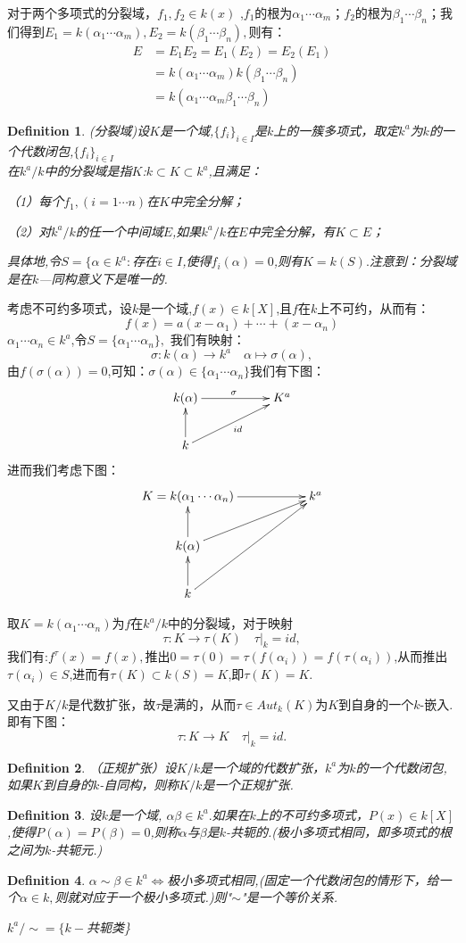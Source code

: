 \documentclass[UTF8]{article}
\newtheorem{defn}{Definition}[section]
\begin{document}
对于两个多项式的分裂域，$f_1,f_2\in k(x)$ ,$f_1$的根为$\alpha_1 \cdots \alpha_m$；$f_2$的根为$\beta_1 \cdots \beta_n$；我们得到$E_1=k(\alpha_1 \cdots \alpha_m),E_2=k(\beta_1 \cdots \beta_n),$则有：
\[
\begin{split}
E&=E_1E_2=E_1(E_2)=E_2(E_1)\\
&=k(\alpha_1 \cdots \alpha_m)k(\beta_1 \cdots \beta_n)\\
&=k(\alpha_1 \cdots \alpha_m \beta_1 \cdots \beta_n)
\end{split}
\]

\begin{defn}
(分裂域)\quad 设$K$是一个域,$\{f_i\}_{i\in I}$是$k$上的一簇多项式，取定$k^a$为$k$的一个代数闭包,$\{f_i\}_{i\in I}$\\在$k^a/k$中的分裂域是指$K$:$k\subset K\subset k^a$,且满足：

（1）每个$f_1,(i=1\cdots n)$在$K$中完全分解；

（2）对$k^a/k$的任一个中间域$E$,如果$k^a/k$在$E$中完全分解，有$K\subset E$；

具体地,令$S=\{\alpha\in k^a:$存在$i\in I$,使得$f_i(\alpha)=0$,则有$K=k(S).$注意到：分裂域是在$k$—同构意义下是唯一的.
\end{defn}
考虑不可约多项式，设$k$是一个域,$f(x)\in k[X]$,且$f$在$k$上不可约，从而有：
$$f(x)=a(x-\alpha_1)+\cdots+(x-\alpha_n)$$
$\alpha_1 \cdots \alpha_n\in k^a$,令$S=\{\alpha_1 \cdots \alpha_n\},$
我们有映射：$$\sigma:k(\alpha)\rightarrow k^a \quad \alpha\longmapsto\sigma(\alpha), $$
由$f(\sigma(\alpha))=0 $,可知：$\sigma(\alpha)\in \{\alpha_1 \cdots \alpha_n\}$我们有下图：$$\xymatrix{k(\alpha)\ar[rr]^{\sigma}&&K^{a}\\k\ar[u] \ar[rru]_{id}&}$$进而我们考虑下图：$$\xymatrix{K=k(\alpha_1 \cdots \alpha_n)\ar[rr]&&{k^a}\\k(\alpha) \ar[u] \ar[rru] && \\k \ar[u] \ar[rruu] &&}$$

取$K=k(\alpha_1 \cdots \alpha_n)$为$f$在$k^a/k$中的分裂域，对于映射$$\tau:K\rightarrow \tau(K) \quad \tau|_k=id,$$我们有:$f^{\tau}(x)=f(x),$推出$0=\tau(0)=\tau(f(\alpha_i))=f(\tau(\alpha_i))$,从而推出$\tau(\alpha_i)\in S$,进而有$\tau (K)\subset k(S)=K$,即$\tau (K)=K.$

又由于$K/k$是代数扩张，故$\tau$是满的，从而$\tau\in Aut_k(K)$为$K$到自身的一个$k$-嵌入.
即有下图：$$\tau:K\rightarrow K \quad\tau|_k=id.$$ 
\begin{defn}
（正规扩张）设$K/k$是一个域的代数扩张，$k^a$为$k$的一个代数闭包,如果$K$到自身的$k$-自同构，则称$K/k$是一个正规扩张.
\end{defn}
\begin{defn}
设$k$是一个域, $\alpha \beta \in k^a.$如果在$k$上的不可约多项式，$P(x)\in k[X]$,使得$P(\alpha)=P(\beta)=0$,则称$\alpha$与$\beta$是$k$-共轭的.(极小多项式相同，即多项式的根之间为$k$-共轭元.)
\end{defn}
\begin{defn}

$\alpha\sim \beta\in k^a\iff $极小多项式相同,(固定一个代数闭包的情形下，给一个$\alpha\in k,$则就对应于一个极小多项式.)则"$\sim$"是一个等价关系.

$k^a/\sim=\{k-$共轭类\}
\end{defn}
\end{document}
